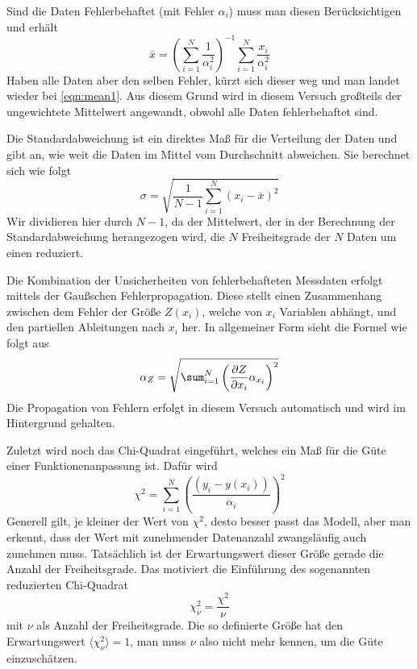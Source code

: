 Sind die Daten Fehlerbehaftet (mit Fehler \( \alpha_i \)) muss man diesen Berücksichtigen und erhält
\begin{equation}\label{eqn:mean2}
	\bar{x} = \left(\sum_{i=1}^{N} \frac{1}{\alpha_i^2}\right)^{-1} \sum_{i=1}^{N} \frac{x_i}{\alpha_i^2}
\end{equation}
Haben alle Daten aber den selben Fehler, kürzt sich dieser weg und man landet wieder bei \autoref{eqn:mean1}. Aus diesem Grund wird in diesem Versuch großteils der ungewichtete Mittelwert angewandt, obwohl alle Daten fehlerbehaftet sind. \cite[S. 50]{error}

Die Standardabweichung ist ein direktes Maß für die Verteilung der Daten und gibt an, wie weit die Daten im Mittel vom Durchschnitt abweichen. Sie berechnet sich wie folgt
\begin{equation}\label{eqn:sigma}
	\sigma = \sqrt{\frac{1}{N-1} \sum_{i=1}^{N}(x_i - \bar{x})^2}
\end{equation}
Wir dividieren hier durch \( N-1 \), da der Mittelwert, der in der Berechnung der Standardabweichung herangezogen wird, die \( N \) Freiheitsgrade der  \( N \) Daten um einen reduziert. \cite[S. 12]{error}

Die Kombination der Unsicherheiten von fehlerbehafteten Messdaten erfolgt mittels der Gaußschen Fehlerpropagation. Diese stellt einen Zusammenhang zwischen dem Fehler der Größe \( Z(x_i) \), welche von \( x_i \) Variablen abhängt, und den partiellen Ableitungen nach \( x_i \) her. In allgemeiner Form sieht die Formel wie folgt aus
\begin{equation}\label{eqn:propagation}
	\alpha_Z = \sqrt{\sum_{i=1}^{N}\left( \pdv{Z}{x_i} \alpha_{x_i}\right)^2}
\end{equation}
\cite[S. 41]{error}
Die Propagation von Fehlern erfolgt in diesem Versuch automatisch und wird im Hintergrund gehalten.

Zuletzt wird noch das Chi-Quadrat eingeführt, welches ein Maß für die Güte einer Funktionenanpassung ist. Dafür wird 
\begin{equation}\label{eqn:chi}
	\chi^2 = \sum_{i=1}^{N} \left(\frac{(y_i - y(x_i))}{\alpha_i}\right)^2
\end{equation}
\cite[S. 65]{error}
Generell gilt, je kleiner der Wert von \( \chi^2 \), desto besser passt das Modell, aber man erkennt, dass der Wert mit zunehmender Datenanzahl zwangsläufig auch zunehmen muss. Tatsächlich ist der Erwartungswert dieser Größe gerade die Anzahl der Freiheitsgrade. Das motiviert die Einführung des sogenannten reduzierten Chi-Quadrat 
\begin{equation}\label{eqn:chinu}
	\chi_{\nu}^2 = \frac{\chi^2}{\nu}
\end{equation}
mit \( \nu \) als Anzahl der Freiheitsgrade.\cite[S. 107]{error} Die so definierte Größe hat den Erwartungswert \( \langle \chi_{\nu}^2 \rangle = 1 \), man muss \( \nu \) also nicht mehr kennen, um die Güte einzuschätzen.

